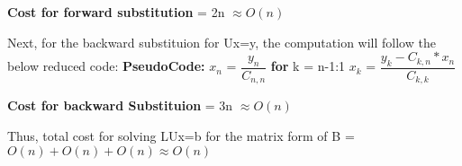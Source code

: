 \documentclass{article}
\newcommand\pseudoCode{\vspace{.10in}\textbf{PseudoCode: }}
\begin{document}
 \textbf {Cost for forward substitution} = 2n $\approx  O(n)$ \newline

Next, for the backward substituion for Ux=y, the computation will follow the below reduced code: \newline
\pseudoCode \newline
  $x_{n}$ = $\dfrac{y_{n}}{C_{n,n}}$ \newline
  \textbf {for} k = n-1:1 \newline
   \hspace*{0.5cm} $x_{k}$ = $\dfrac{y_{k} - C_{k,n}*x_{n}}{C_{k,k}}$ \newline

\textbf {Cost for backward Substituion} = 3n $\approx O(n)$

Thus, total cost for solving LUx=b for the matrix form of B = $O(n) + O(n) + O(n) \approx O(n)$
\end{document}
